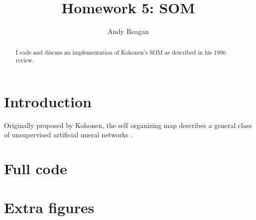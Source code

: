 \documentclass[pre,twocolumn,twoside,byrevtex,superscriptaddress]{revtex4}
\begin{document}




\title{\vspace{-2cm}Homework 5: SOM}
\author{Andy Reagan}

\begin{abstract}
I code and discuss an implementation of Kohonen's SOM as described in his 1990 review.
\end{abstract}

\maketitle


\section{Introduction}

Originally proposed by Kohonen, the self organizing map describes a general class of unsupervised artificial nueral networks \cite{kohonen1990self}.


\clearpage
\pagebreak




\clearpage
\pagebreak
\onecolumngrid

    \section*{Full code}

    
    

\clearpage
\pagebreak

    \section*{Extra figures}

\end{document}
